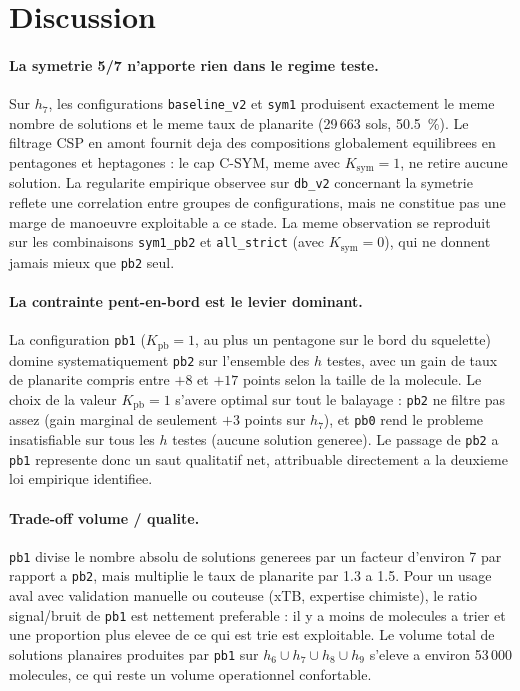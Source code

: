 \documentclass[11pt,a4paper]{article}
\begin{document}
\section{Discussion}

\paragraph{La symetrie 5/7 n'apporte rien dans le regime teste.}
Sur $h_7$, les configurations \texttt{baseline\_v2} et \texttt{sym1}
produisent exactement le meme nombre de solutions et le meme taux de
planarite (29\,663 sols, 50.5~\%). Le filtrage CSP en amont fournit
deja des compositions globalement equilibrees en pentagones et
heptagones : le cap C-SYM, meme avec $K_{\text{sym}} = 1$, ne retire
aucune solution. La regularite empirique observee sur \texttt{db\_v2}
concernant la symetrie reflete une correlation entre groupes de
configurations, mais ne constitue pas une marge de manoeuvre
exploitable a ce stade. La meme observation se reproduit sur les
combinaisons \texttt{sym1\_pb2} et \texttt{all\_strict} (avec
$K_{\text{sym}} = 0$), qui ne donnent jamais mieux que \texttt{pb2}
seul.

\paragraph{La contrainte pent-en-bord est le levier dominant.}
La configuration \texttt{pb1} ($K_{\text{pb}} = 1$, au plus un pentagone
sur le bord du squelette) domine systematiquement \texttt{pb2} sur
l'ensemble des $h$ testes, avec un gain de taux de planarite compris
entre $+8$ et $+17$ points selon la taille de la molecule. Le choix de
la valeur $K_{\text{pb}} = 1$ s'avere optimal sur tout le balayage :
\texttt{pb2} ne filtre pas assez (gain marginal de seulement $+3$
points sur $h_7$), et \texttt{pb0} rend le probleme insatisfiable sur
tous les $h$ testes (aucune solution generee). Le passage de
\texttt{pb2} a \texttt{pb1} represente donc un saut qualitatif net,
attribuable directement a la deuxieme loi empirique identifiee.

\paragraph{Trade-off volume / qualite.}
\texttt{pb1} divise le nombre absolu de solutions generees par un
facteur d'environ 7 par rapport a \texttt{pb2}, mais multiplie le taux
de planarite par 1.3 a 1.5. Pour un usage aval avec validation
manuelle ou couteuse (xTB, expertise chimiste), le ratio signal/bruit
de \texttt{pb1} est nettement preferable : il y a moins de molecules a
trier et une proportion plus elevee de ce qui est trie est exploitable.
Le volume total de solutions planaires produites par \texttt{pb1} sur
$h_6 \cup h_7 \cup h_8 \cup h_9$ s'eleve a environ 53\,000 molecules,
ce qui reste un volume operationnel confortable.
\end{document}
